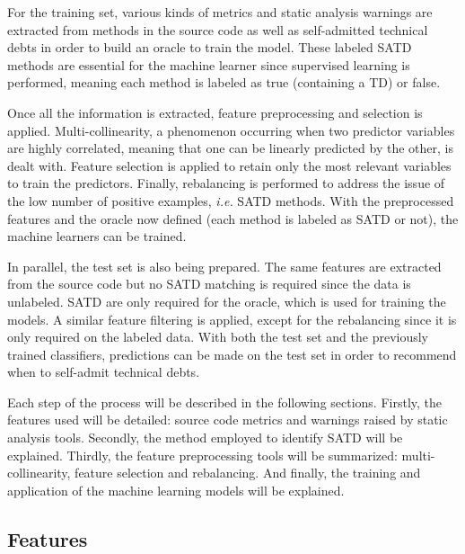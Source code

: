 For the training set, various kinds of metrics and static analysis warnings are extracted from methods in the source code as well as self-admitted technical debts in order to build an oracle to train the model. These labeled \ac{SATD} methods are essential for the machine learner since supervised learning is performed, meaning each method is labeled as true (containing a TD) or false. \par 

Once all the information is extracted, feature preprocessing and selection is applied. Multi-collinearity, a phenomenon occurring when two predictor variables are highly correlated, meaning that one can be linearly predicted by the other, is dealt with. Feature selection is applied to retain only the most relevant variables to train the predictors. Finally, rebalancing is performed to address the issue of the low number of positive examples, \textit{i.e.} \ac{SATD} methods. With the preprocessed features and the oracle now defined (each method is labeled as \ac{SATD} or not), the machine learners can be trained. \par 

In parallel, the test set is also being prepared. The same features are extracted from the source code but no \ac{SATD} matching is required since the data is unlabeled. \ac{SATD} are only required for the oracle, which is used for training the models. A similar feature filtering is applied, except for the rebalancing since it is only required on the labeled data. With both the test set and the previously trained classifiers, predictions can be made on the test set in order to recommend when to self-admit technical debts. \par

Each step of the process will be described in the following sections. Firstly, the features used will be detailed: source code metrics and warnings raised by static analysis tools. Secondly, the method employed to identify \ac{SATD} will be explained. Thirdly, the feature preprocessing tools will be summarized: multi-collinearity, feature selection and rebalancing. And finally, the training and application of the machine learning models will be explained.

\subsection{Features}



